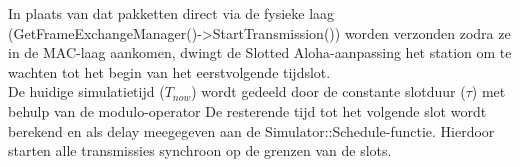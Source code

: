In plaats van dat pakketten direct via de fysieke laag (GetFrameExchangeManager()->StartTransmission()) worden verzonden zodra ze in de MAC-laag aankomen, dwingt de Slotted Aloha-aanpassing het station om te wachten tot het begin van het eerstvolgende tijdslot.\\

De huidige simulatietijd ($T_{now}$) wordt gedeeld door de constante slotduur ($\tau$) met behulp van de modulo-operator  De resterende tijd tot het volgende slot wordt berekend en als delay meegegeven aan de Simulator::Schedule-functie. Hierdoor starten alle transmissies synchroon op de grenzen van de slots.